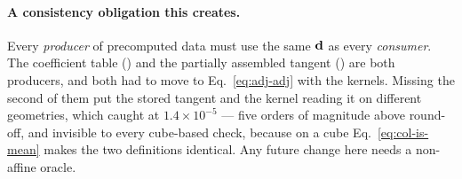 \paragraph{A consistency obligation this creates.} Every \emph{producer} of precomputed data must
use the same $\mathbf{d}$ as every \emph{consumer}. The coefficient table
() and the partially assembled tangent
() are both producers, and both had to move to
Eq.~\eqref{eq:adj-adj} with the kernels. Missing the second of them put the stored tangent and the
kernel reading it on different geometries, which  caught at
$1.4\times10^{-5}$ --- five orders of magnitude above round-off, and invisible to every
cube-based check, because on a cube Eq.~\eqref{eq:col-is-mean} makes the two definitions
identical. Any future change here needs a non-affine oracle.
